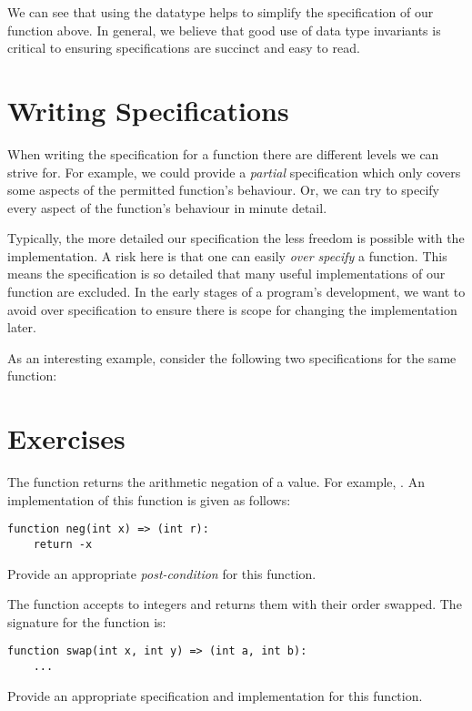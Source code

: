 We can see that using the  datatype helps to simplify the specification of our  function above.  In general, we believe that good use of data type invariants is critical to ensuring specifications are succinct and easy to read.

\section{Writing Specifications}

When writing the specification for a function there are different levels we can strive for.  For example, we could provide a {\em partial} specification which only covers some aspects of the permitted function's behaviour.  Or, we can try to specify every aspect of the function's behaviour in minute detail.  

Typically, the more detailed our specification the less freedom is possible with the implementation.  A risk here is that one can easily {\em over specify} a function.  This means the specification is so detailed that many useful implementations of our function are excluded.  In the early stages of a program's development, we want to avoid over specification to ensure there is scope for changing the implementation later.  

As an interesting example, consider the following two specifications for the same function: 

\section*{Exercises}

\begin{ex}
The function  returns the arithmetic negation of a value.
For example, .  An implementation of
this function is given as follows:
\begin{lstlisting}
function neg(int x) => (int r):
    return -x
\end{lstlisting}
Provide an appropriate {\em post-condition} for this function.
\end{ex}

\begin{ex}
The  function accepts to integers and returns them
with their order swapped.  The signature for the function is:
\begin{lstlisting}
function swap(int x, int y) => (int a, int b):
    ...
\end{lstlisting}
Provide an appropriate specification and implementation for this function.
\end{ex}


